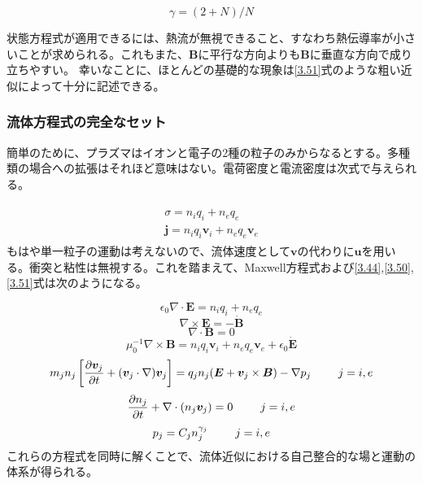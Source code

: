 \documentclass{ltjsarticle}
\numberwithin{equation}{section} %
\begin{document}
\begin{equation}
  \gamma = (2+N)/N \label{3.53}
\end{equation}

状態方程式が適用できるには、熱流が無視できること、すなわち熱伝導率が小さいことが求められる。これもまた、$\bm{B}$に平行な方向よりも$\bm{B}$に垂直な方向で成り立ちやすい。
幸いなことに、ほとんどの基礎的な現象は\eqref{3.51}式のような粗い近似によって十分に記述できる。


\subsubsection{流体方程式の完全なセット} \label{section3.3.7}
簡単のために、プラズマはイオンと電子の2種の粒子のみからなるとする。多種類の場合への拡張はそれほど意味はない。電荷密度と電流密度は次式で与えられる。

\begin{align}
  \begin{split}
    \sigma = n_iq_i + n_eq_e\\
    \bm{j} = n_iq_i\bm{v}_i + n_eq_e\bm{v}_e
  \end{split} \label{3.54}
\end{align}
もはや単一粒子の運動は考えないので、流体速度として$\bm{v}$の代わりに$\bm{u}$を用いる。衝突と粘性は無視する。これを踏まえて、Maxwell方程式および\eqref{3.44},\eqref{3.50},\eqref{3.51}式は次のようになる。

\begin{equation}
  \epsilon_0\nabla \cdot \bm{E} = n_iq_i + n_eq_e \label{3.55}
\end{equation}
\begin{equation}
  \nabla \times \bm{E} = -\dot{\bm{B}} \label{3.56}
\end{equation}
\begin{equation}
  \nabla \cdot \bm{B} = 0 \label{3.57}
\end{equation}
\begin{equation}
  \mu^{-1}_0 \nabla \times \bm{B} = n_iq_i\bm{v}_i + n_eq_e\bm{v}_e + \epsilon_0\dot{\bm{E}} \label{3.58}
\end{equation}
\begin{equation}
  m_jn_j\left[\frac{\partial \bm{v}_j}{\partial t} + (\bm{v}_j \cdot \nabla)\bm{v}_j\right] = q_jn_j(\bm{E} + \bm{v}_j \times \bm{B}) - \nabla p_j \hspace{2pc} j=i,e \label{3.59}
\end{equation}
\begin{equation}
  \frac{\partial n_j}{\partial t} + \nabla \cdot (n_j\bm{v}_j) = 0 \hspace{2pc} j=i,e \label{3.60}
\end{equation}
\begin{equation}
  p_j = C_jn^{\gamma_j}_j \hspace{2pc} j=i,e \label{3.61} 
\end{equation}
これらの方程式を同時に解くことで、流体近似における自己整合的な場と運動の体系が得られる。
\end{document}
